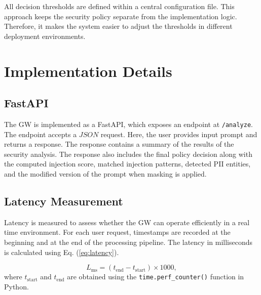\documentclass[conference]{IEEEtran}
\begin{document}
All decision thresholds are defined within a central configuration file. This approach keeps the security policy separate from the implementation logic. Therefore, it makes the system easier to adjust the thresholds in different deployment environments. %
\section{Implementation Details}
\label{sec:impl}

\subsection{FastAPI}

The GW is implemented as a FastAPI, which exposes an endpoint at \texttt{/analyze}. The endpoint accepts a $JSON$ request. Here, the user provides input prompt and returns a response. The response contains a summary of the results of the security analysis. The response also includes the final policy decision along with the computed injection score, matched injection patterns, detected PII entities, and the modified version of the prompt when masking is applied. %

\subsection{Latency Measurement}

Latency is measured to assess whether the GW can operate efficiently in a real time environment. For each user request, timestamps are recorded at the beginning and at the end of the processing pipeline. The latency in milliseconds is calculated using Eq. (\ref{eq:latency}).

\begin{equation}
L_{\mathrm{ms}} = (t_{\mathrm{end}} - t_{\mathrm{start}}) \times 1000,
\label{eq:latency}
\end{equation}
where $t_{\mathrm{start}}$ and $t_{\mathrm{end}}$ are obtained using the \texttt{time.perf\_counter()} function in Python.
\end{document}
